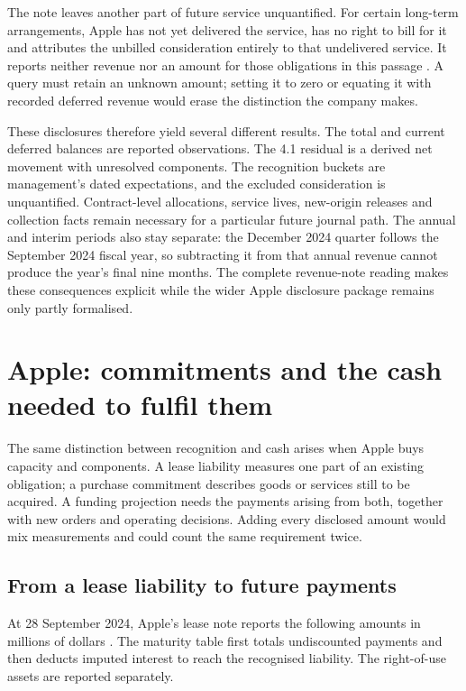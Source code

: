 The note leaves another part of future service unquantified. For certain
long-term arrangements, Apple has not yet delivered the service, has no right
to bill for it and attributes the unbilled consideration entirely to that
undelivered service. It reports neither revenue nor an amount for those
obligations in this passage \citep[Note 2, printed p.~35]{apple2024}. A query
must retain an unknown amount; setting it to zero or equating it with recorded
deferred revenue would erase the distinction the company makes.

These disclosures therefore yield several different results. The total and
current deferred balances are reported observations. The 4.1 residual is a
derived net movement with unresolved components. The recognition buckets are
management's dated expectations, and the excluded consideration is unquantified.
Contract-level allocations, service lives, new-origin releases and collection
facts remain necessary for a particular future journal path. The annual and
interim periods also stay separate: the December 2024 quarter follows the
September 2024 fiscal year, so subtracting it from that annual revenue cannot
produce the year's final nine months. The complete revenue-note reading makes
these consequences explicit while the wider Apple disclosure package remains
only partly formalised.

\section{Apple: commitments and the cash needed to fulfil them}
\label{sec:apple-commitments}

The same distinction between recognition and cash arises when Apple buys
capacity and components. A lease liability measures one part of an existing
obligation; a purchase commitment describes goods or services still to be
acquired. A funding projection needs the payments arising from both, together
with new orders and operating decisions. Adding every disclosed amount would
mix measurements and could count the same requirement twice.

\subsection{From a lease liability to future payments}

At 28 September 2024, Apple's lease note reports the following amounts in
millions of dollars \citep[Note 8, printed p.~42]{apple2024}. The maturity table
first totals undiscounted payments and then deducts imputed interest to reach
the recognised liability. The right-of-use assets are reported separately.

